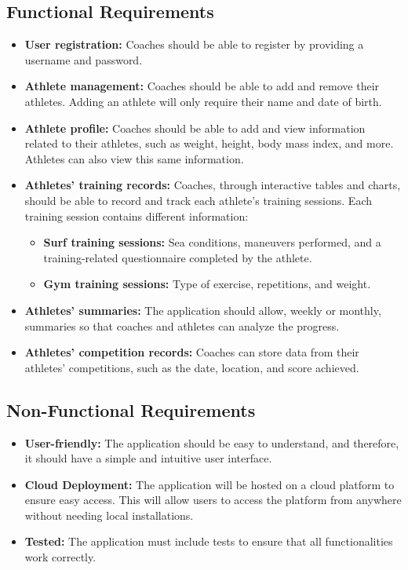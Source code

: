 \subsection{Functional Requirements} \label{sec121}
\begin{itemize}
\item \textbf{User registration:} Coaches should be able to register by providing a username and password.
\item \textbf{Athlete management:} Coaches should be able to add and remove their athletes. Adding an athlete will only require their name and date of birth.
\item \textbf{Athlete profile:} Coaches should be able to add and view information related to their athletes, such as weight, height, body mass index, and more. Athletes can also view this same information.
\item \textbf{Athletes' training records:} Coaches, through interactive tables and charts, should be able to record and track each athlete's training sessions. Each training session contains different information:
\begin{itemize}
\item \textbf{Surf training sessions:} Sea conditions, maneuvers performed, and a training-related questionnaire completed by the athlete.
\item \textbf{Gym training sessions:} Type of exercise, repetitions, and weight.
\end{itemize}
\item \textbf{Athletes' summaries:} The application should allow, weekly or monthly, summaries so that coaches and athletes can analyze the progress.
\item \textbf{Athletes' competition records:} Coaches can store data from their athletes' competitions, such as the date, location, and score achieved.
\end{itemize}
%
%
\subsection{Non-Functional Requirements} \label{sec122}
\begin{itemize}
\item \textbf{User-friendly:} The application should be easy to understand, and therefore, it should have a simple and intuitive user interface.
\item \textbf{Cloud Deployment:} The application will be hosted on a cloud platform to ensure easy access. This will allow users to access the platform from anywhere without needing local installations.
\item \textbf{Tested:} The application must include tests to ensure that all functionalities work correctly.
\end{itemize}


